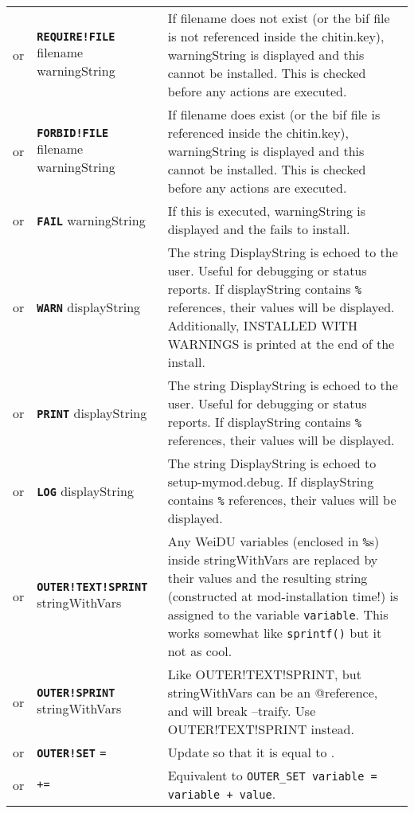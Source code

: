 \documentclass{article}
\def\ttref#1{\ahrefloc{#1}{\tt #1}}
\def\DEFINE#1{{\tt \bf #1}\label{#1}\index{#1}}
\def\t#1{{\tt #1}}
\begin{document}
\begin{tabular}{cp{10in}|p{10in}}
  or & \DEFINE{REQUIRE!FILE} filename warningString &
    If filename does not exist (or the bif file is not referenced inside
    the chitin.key), warningString is displayed and this
    \ttref{component} cannot be installed. This is checked before any
    actions are executed. \\
  or & \DEFINE{FORBID!FILE} filename warningString &
    If filename does exist (or the bif file is referenced inside
    the chitin.key), warningString is displayed and this
    \ttref{component} cannot be installed. This is checked before any
    actions are executed. \\
  or & \DEFINE{FAIL} warningString &
    If this \ttref{TP2 Action} is executed, warningString is displayed and
    the \ttref{component} fails to install. \\
  or & \DEFINE{WARN} displayString &
    The string DisplayString is echoed to the user. Useful for debugging or
    status reports. If displayString contains \t{\%}\ttref{variable}\t{\%}
    references, their values will be displayed. Additionally, INSTALLED WITH
    WARNINGS is printed at the end of the install.
    \\
  or & \DEFINE{PRINT} displayString &
    The string DisplayString is echoed to the user. Useful for debugging or
    status reports. If displayString contains \t{\%}\ttref{variable}\t{\%}
    references, their values will be displayed. \\
  or & \DEFINE{LOG} displayString &
    The string DisplayString is echoed to setup-mymod.debug.
    If displayString contains \t{\%}\ttref{variable}\t{\%}
    references, their values will be displayed. \\
or & \DEFINE{OUTER!TEXT!SPRINT} \ttref{variable} stringWithVars &
  Any WeiDU variables (enclosed in \t{\%}s) inside stringWithVars are
  replaced by their values and the resulting string (constructed at
  mod-installation time!) is assigned to the variable \t{variable}. 
  This works somewhat like \t{sprintf()} but it not as cool. \\
or & \DEFINE{OUTER!SPRINT} \ttref{variable} stringWithVars &
  Like OUTER!TEXT!SPRINT, but stringWithVars can be an @reference, and will
  break --traify. Use OUTER!TEXT!SPRINT instead. \\
or & \DEFINE{OUTER!SET} \ttref{variable} \t{=} \ttref{value} &
  Update \ttref{variable} so that it is equal to \ttref{value}. \\
or & \ttref{OUTER!SET} \ttref{variable} \t{+=} \ttref{value} &
  Equivalent to \t{OUTER_SET variable = variable + value}. \\

\end{tabular}
\end{document}
